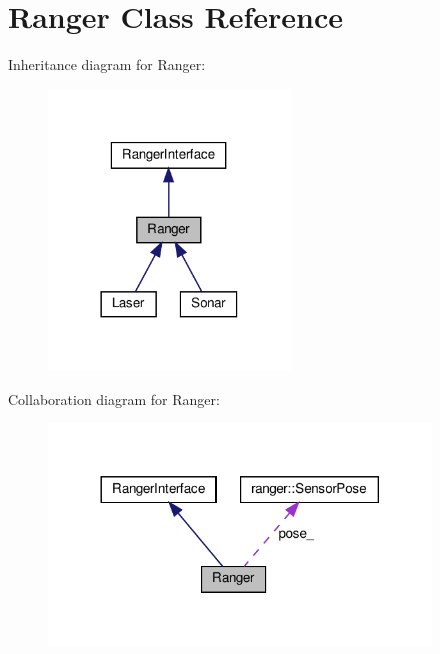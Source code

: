 \hypertarget{classRanger}{}\section{Ranger Class Reference}
\label{classRanger}


Inheritance diagram for Ranger\+:\nopagebreak
\begin{figure}[H]
\begin{center}
\leavevmode
\includegraphics[width=182pt]{classRanger__inherit__graph}
\end{center}
\end{figure}


Collaboration diagram for Ranger\+:\nopagebreak
\begin{figure}[H]
\begin{center}
\leavevmode
\includegraphics[width=288pt]{classRanger__coll__graph}
\end{center}
\end{figure}
